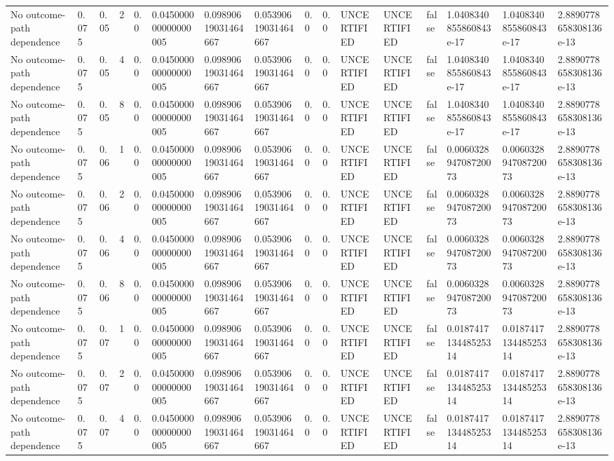 \begin{tabular}{llllllllllllllll}
No outcome-path dependence & 0.075 & 0.05 & 2 & 0.0 & 0.045000000000000005 & 0.09890619031464667 & 0.05390619031464667 & 0.0 & 0.0 & UNCERTIFIED & UNCERTIFIED & false & 1.0408340855860843e-17 & 1.0408340855860843e-17 & 2.8890778658308136e-13 \\
No outcome-path dependence & 0.075 & 0.05 & 4 & 0.0 & 0.045000000000000005 & 0.09890619031464667 & 0.05390619031464667 & 0.0 & 0.0 & UNCERTIFIED & UNCERTIFIED & false & 1.0408340855860843e-17 & 1.0408340855860843e-17 & 2.8890778658308136e-13 \\
No outcome-path dependence & 0.075 & 0.05 & 8 & 0.0 & 0.045000000000000005 & 0.09890619031464667 & 0.05390619031464667 & 0.0 & 0.0 & UNCERTIFIED & UNCERTIFIED & false & 1.0408340855860843e-17 & 1.0408340855860843e-17 & 2.8890778658308136e-13 \\
No outcome-path dependence & 0.075 & 0.06 & 1 & 0.0 & 0.045000000000000005 & 0.09890619031464667 & 0.05390619031464667 & 0.0 & 0.0 & UNCERTIFIED & UNCERTIFIED & false & 0.006032894708720073 & 0.006032894708720073 & 2.8890778658308136e-13 \\
No outcome-path dependence & 0.075 & 0.06 & 2 & 0.0 & 0.045000000000000005 & 0.09890619031464667 & 0.05390619031464667 & 0.0 & 0.0 & UNCERTIFIED & UNCERTIFIED & false & 0.006032894708720073 & 0.006032894708720073 & 2.8890778658308136e-13 \\
No outcome-path dependence & 0.075 & 0.06 & 4 & 0.0 & 0.045000000000000005 & 0.09890619031464667 & 0.05390619031464667 & 0.0 & 0.0 & UNCERTIFIED & UNCERTIFIED & false & 0.006032894708720073 & 0.006032894708720073 & 2.8890778658308136e-13 \\
No outcome-path dependence & 0.075 & 0.06 & 8 & 0.0 & 0.045000000000000005 & 0.09890619031464667 & 0.05390619031464667 & 0.0 & 0.0 & UNCERTIFIED & UNCERTIFIED & false & 0.006032894708720073 & 0.006032894708720073 & 2.8890778658308136e-13 \\
No outcome-path dependence & 0.075 & 0.07 & 1 & 0.0 & 0.045000000000000005 & 0.09890619031464667 & 0.05390619031464667 & 0.0 & 0.0 & UNCERTIFIED & UNCERTIFIED & false & 0.018741713448525314 & 0.018741713448525314 & 2.8890778658308136e-13 \\
No outcome-path dependence & 0.075 & 0.07 & 2 & 0.0 & 0.045000000000000005 & 0.09890619031464667 & 0.05390619031464667 & 0.0 & 0.0 & UNCERTIFIED & UNCERTIFIED & false & 0.018741713448525314 & 0.018741713448525314 & 2.8890778658308136e-13 \\
No outcome-path dependence & 0.075 & 0.07 & 4 & 0.0 & 0.045000000000000005 & 0.09890619031464667 & 0.05390619031464667 & 0.0 & 0.0 & UNCERTIFIED & UNCERTIFIED & false & 0.018741713448525314 & 0.018741713448525314 & 2.8890778658308136e-13 \\

\end{tabular}
